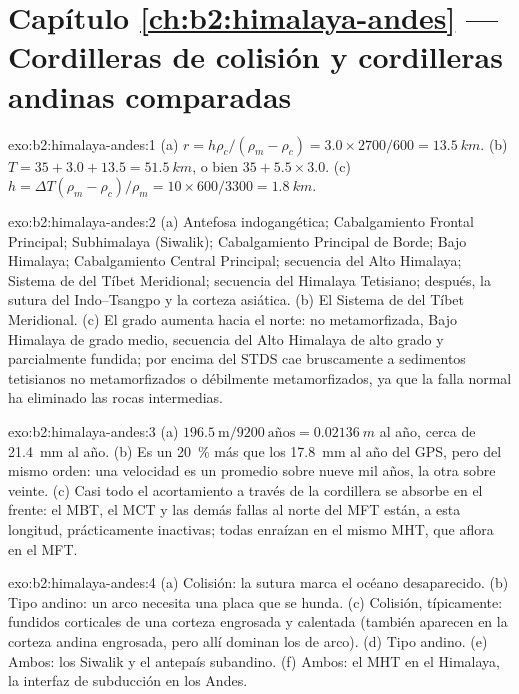 \section*{Capítulo \ref{ch:b2:himalaya-andes} --- Cordilleras de colisión y cordilleras andinas comparadas}

\begin{solution}{exo:b2:himalaya-andes:1}
(a) $r = h\rho_c/(\rho_m - \rho_c) = 3.0\times2700/600 = \qty{13.5}{km}$. (b) $T = 35 + 3.0 +
13.5 = \qty{51.5}{km}$, o bien $35 + 5.5\times3.0$. (c) $h = \Delta T(\rho_m - \rho_c)/\rho_m =
10\times600/3300 = \qty{1.8}{km}$.
\end{solution}

\begin{solution}{exo:b2:himalaya-andes:2}
(a) Antefosa indogangética; Cabalgamiento Frontal Principal; Subhimalaya (Siwalik); Cabalgamiento Principal
de Borde; Bajo Himalaya; Cabalgamiento Central Principal; secuencia del Alto Himalaya; Sistema de 
del Tíbet Meridional; secuencia del Himalaya Tetisiano; después, la sutura del Indo--Tsangpo y la corteza
asiática. (b) El Sistema de  del Tíbet Meridional. (c) El grado aumenta hacia el norte:  no metamorfizada,
Bajo Himalaya de grado medio, secuencia del Alto Himalaya de alto grado y parcialmente
fundida; por encima del STDS cae bruscamente a sedimentos tetisianos no metamorfizados o débilmente
metamorfizados, ya que la falla normal ha eliminado las rocas intermedias.
\end{solution}

\begin{solution}{exo:b2:himalaya-andes:3}
(a) $196.5\ \text{m}/9200\ \text{años} = \qty{0.02136}{m}$ al año, cerca de \qty{21.4}{mm} al año.
(b) Es un \qty{20}{\percent} más que los \qty{17.8}{mm} al año del GPS, pero del mismo orden:
una velocidad es un promedio sobre nueve mil años, la otra sobre veinte.
(c) Casi todo el acortamiento a través de la cordillera se absorbe en el frente: el MBT, el MCT y
las demás fallas al norte del MFT están, a esta longitud, prácticamente inactivas; todas enraízan
en el mismo MHT, que aflora en el MFT.
\end{solution}

\begin{solution}{exo:b2:himalaya-andes:4}
(a) Colisión: la sutura marca el océano desaparecido. (b) Tipo andino: un arco necesita una placa
que se hunda. (c) Colisión, típicamente: fundidos corticales de una corteza engrosada y calentada (también
aparecen en la corteza andina engrosada, pero allí dominan los  de arco). (d) Tipo andino.
(e) Ambos: los Siwalik y el antepaís subandino. (f) Ambos: el MHT en el Himalaya, la
interfaz de subducción en los Andes.
\end{solution}

